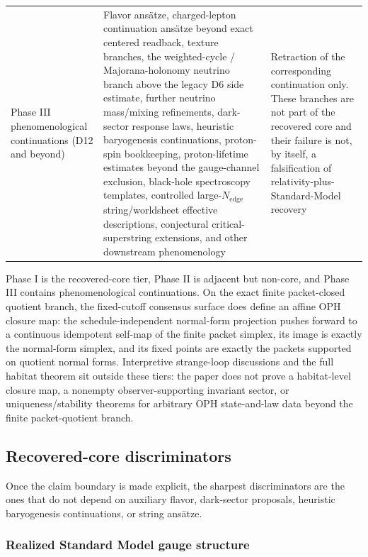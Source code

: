 \documentclass[11pt]{article}
\begin{document}
\begin{longtable}{@{}>{\raggedright\arraybackslash}p{}>{\raggedright\arraybackslash}p{}>{\raggedright\arraybackslash}p{}@{}}
Phase III phenomenological continuations (D12 and beyond) & Flavor ans\"atze, charged-lepton continuation ans\"atze beyond exact centered readback, texture branches, the weighted-cycle / Majorana-holonomy neutrino branch above the legacy D6 side estimate, further neutrino mass/mixing refinements, dark-sector response laws, heuristic baryogenesis continuations, proton-spin bookkeeping, proton-lifetime estimates beyond the gauge-channel exclusion, black-hole spectroscopy templates, controlled large-\(N_{\mathrm{edge}}\) string/worldsheet effective descriptions, conjectural critical-superstring extensions, and other downstream phenomenology & Retraction of the corresponding continuation only. These branches are not part of the recovered core and their failure is not, by itself, a falsification of relativity-plus-Standard-Model recovery \\
\end{longtable}
\endgroup

Phase I is the recovered-core tier, Phase II is adjacent but non-core, and Phase III contains phenomenological continuations. On the exact finite packet-closed quotient branch, the fixed-cutoff consensus surface does define an affine OPH closure map: the schedule-independent normal-form projection pushes forward to a continuous idempotent self-map of the finite packet simplex, its image is exactly the normal-form simplex, and its fixed points are exactly the packets supported on quotient normal forms. Interpretive strange-loop discussions and the full habitat theorem sit outside these tiers: the paper does not prove a habitat-level closure map, a nonempty observer-supporting invariant sector, or uniqueness/stability theorems for arbitrary OPH state-and-law data beyond the finite packet-quotient branch.

\subsection{Recovered-core discriminators}

Once the claim boundary is made explicit, the sharpest discriminators are the ones that do not depend on auxiliary flavor, dark-sector proposals, heuristic baryogenesis continuations, or string ans\"atze.

\subsubsection{Realized Standard Model gauge structure}
\end{document}
